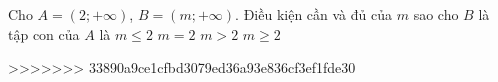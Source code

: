 \begin{ex}%
	Cho $A=(2;+\infty)$, $B=(m;+\infty)$. Điều kiện cần và đủ của $m$ sao cho $B$ là tập con của $A$ là
	\choice
	{$m\leqslant 2$}
	{$m=2$}
	{$m>2$}
	{\True $m\geqslant 2$}
\end{ex}

>>>>>>> 33890a9ce1cfbd3079ed36a93e836cf3ef1fde30
